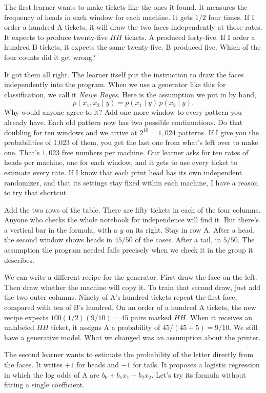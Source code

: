 The first learner wants to make tickets like the ones it found. It measures the frequency of heads in each window for each machine. It gets $1/2$ four times. If I order a hundred A tickets, it will draw the two faces independently at those rates. It expects to produce twenty-five $HH$ tickets. A produced forty-five. If I order a hundred B tickets, it expects the same twenty-five. B produced five. Which of the four counts did it get wrong?

It got them all right. The learner itself put the instruction to draw the faces independently into the program. When we use a generator like this for classification, we call it \emph{Naive Bayes}. Here is the assumption we put in by hand,
\[
     p(x_1,x_2\mid y)=p(x_1\mid y)\,p(x_2\mid y).
\]
Why would anyone agree to it? Add one more window to every pattern you already have. Each old pattern now has two possible continuations. Do that doubling for ten windows and we arrive at $2^{10}=1{,}024$ patterns. If I give you the probabilities of 1,023 of them, you get the last one from what's left over to make one. That's $1{,}023$ free numbers per machine. Our learner asks for ten rates of heads per machine, one for each window, and it gets to use every ticket to estimate every rate. If I know that each print head has its own independent randomizer, and that its settings stay fixed within each machine, I have a reason to try that shortcut.

Add the two rows of the table. There are fifty tickets in each of the four columns. Anyone who checks the whole notebook for independence will find it. But there's a vertical bar in the formula, with a $y$ on its right. Stay in row A. After a head, the second window shows heads in $45/50$ of the cases. After a tail, in $5/50$. The assumption the program needed fails precisely when we check it in the group it describes.

We can write a different recipe for the generator. First draw the face on the left. Then draw whether the machine will copy it. To train that second draw, just add the two outer columns. Ninety of A's hundred tickets repeat the first face, compared with ten of B's hundred. On an order of a hundred A tickets, the new recipe expects $100(1/2)(9/10)=45$ pairs marked $HH$. When it receives an unlabeled $HH$ ticket, it assigns A a probability of $45/(45+5)=9/10$. We still have a generative model. What we changed was an assumption about the printer.

The second learner wants to estimate the probability of the letter directly from the faces. It writes $+1$ for heads and $-1$ for tails. It proposes a logistic regression in which the log odds of A are $b_0+b_1x_1+b_2x_2$. Let's try its formula without fitting a single coefficient.

